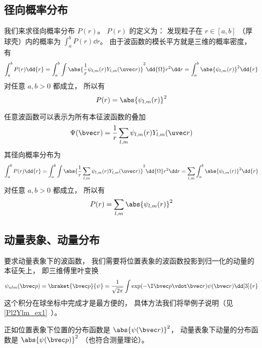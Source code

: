 \subsection{径向概率分布}
我们来求径向概率分布 $P(r)$。 $P(r)$ 的定义为： 发现粒子在 $r \in [a, b]$ （厚球壳）内的概率为 $\int_a^b P(r) \dd{r}$。 由于波函数的模长平方就是三维的概率密度， 有
\begin{equation}
\int_a^b P(r) \dd{r} = \int_a^b \int \abs{\frac1r \psi_{l,m}(r) Y_{l,m}(\uvec r)}^2 \dd{\Omega} r^2 \dd r
= \int_a^b \abs{\psi_{l,m}(r)}^2 \dd{r}
\end{equation}
对任意 $a, b > 0$ 都成立， 所以有
\begin{equation}
P(r) = \abs{\psi_{l,m}(r)}^2
\end{equation}

任意波函数可以表示为所有本征波函数的叠加
\begin{equation}
\Psi(\bvec r) = \frac1r \sum_{l,m} \psi_{l,m}(r) Y_{l,m}(\uvec r)
\end{equation}
其径向概率分布为
\begin{equation}\label{HWF_eq4}
\int_a^b P(r) \dd{r} = \int_a^b \int \abs{\frac1r \sum_{l,m}\psi_{l,m}(r) Y_{l,m}(\uvec r)}^2 \dd{\Omega} r^2 \dd r
= \sum_{l,m} \int_a^b \abs{\psi_{l,m}(r)}^2 \dd{r}
\end{equation}
对任意 $a, b > 0$ 都成立， 所以有
\begin{equation}
P(r) = \sum_{l,m} \abs{\psi_{l,m}(r)}^2
\end{equation}

\subsection{动量表象、动量分布}
要求动量表象下的波函数， 我们需要将位置表象的波函数投影到归一化的动量的本征矢上， 即三维傅里叶变换
\begin{equation}
\psi_{nlm}(\bvec p) = \braket{\bvec p}{\psi} = \frac{1}{\sqrt{2\pi}} \int \exp(-\I \bvec p \vdot \bvec r) \psi(\bvec r) \dd[3]{r}
\end{equation}
这个积分在球坐标中完成才是最方便的， 具体方法我们将举例子说明（见\autoref{Pl2Ylm_ex1}~）。

正如位置表象下位置的分布函数是 $\abs{\psi(\bvec r)}^2$， 动量表象下动量的分布函数是 $\abs{\psi(\bvec p)}^2$ （也符合测量理论）。
